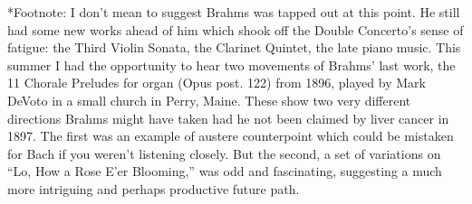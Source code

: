 *Footnote: I don’t mean to suggest Brahms was tapped out at this point. He still had some new works ahead of him which shook off the Double Concerto’s sense of fatigue: the Third Violin Sonata, the Clarinet Quintet, the late piano music. This summer I had the opportunity to hear two movements of Brahms’ last work, the 11 Chorale Preludes for organ (Opus post. 122) from 1896, played by Mark DeVoto in a small church in Perry, Maine. These show two very different directions Brahms might have taken had he not been claimed by liver cancer in 1897. The first was an example of austere counterpoint which could be mistaken for Bach if you weren’t listening closely. But the second, a set of variations on “Lo, How a Rose E’er Blooming,” was odd and fascinating, suggesting a much more intriguing and perhaps productive future path.
